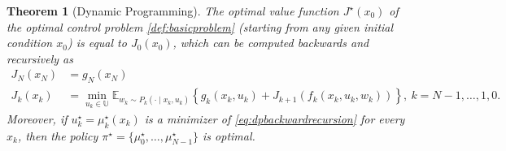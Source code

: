 \documentclass[
]{book}
\newtheorem{theorem}{Theorem}[chapter]
\theoremstyle{definition}
\theoremstyle{definition}
\theoremstyle{definition}
\theoremstyle{definition}
\theoremstyle{remark}
\begin{document}
\begin{theorem}[Dynamic Programming]
\protect\hypertarget{thm:dynamicprogramming}{}\label{thm:dynamicprogramming}The optimal value function \(J^\star(x_0)\) of the optimal control problem \ref{def:basicproblem} (starting from any given initial condition \(x_0\)) is equal to \(J_0(x_0)\), which can be computed backwards and recursively as
\begin{align}
J_N(x_N) &= g_N(x_N) \\
J_k(x_k) &= \min_{u_k \in \mathbb{U}} \displaystyle \mathbb{E}_{w_k \sim P_k(\cdot \mid x_k, u_k)} \displaystyle \left\{ g_k(x_k,u_k) + J_{k+1}(f_k(x_k,u_k,w_k) ) \right\}, \ k=N-1,\dots,1,0.
\label{eq:dpbackwardrecursion}
\end{align}
Moreover, if \(u_k^\star = \mu_k^\star(x_k)\) is a minimizer of \eqref{eq:dpbackwardrecursion} for every \(x_k\), then the policy \(\pi^\star = \{\mu_0^\star,\dots,\mu_{N-1}^\star \}\) is optimal.
\end{theorem}
\end{document}
